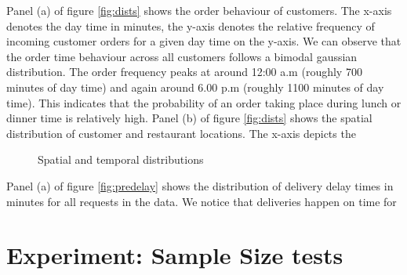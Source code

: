 Panel (a) of figure \ref{fig:dists} shows the order behaviour of customers. The x-axis denotes the day time in minutes, the y-axis denotes the relative frequency of incoming customer orders for a given day time on the y-axis. We can observe that the order time behaviour across all customers follows a bimodal gaussian distribution. The order frequency peaks at around 12:00 a.m (roughly 700 minutes of day time) and again around 6.00 p.m (roughly 1100 minutes of day time). This indicates that the probability of an order taking place during lunch or dinner time is relatively high.  
Panel (b) of figure \ref{fig:dists} shows the spatial distribution of customer and restaurant locations. The x-axis depicts the  

\begin{figure}[h]
	\centering
	\caption{Spatial and temporal distributions}
	\label{fig:prepdelay}
\end{figure}

Panel (a) of figure \ref{fig:predelay} shows the distribution of delivery delay times in minutes for all requests in the data. We notice that deliveries happen on time for 


\section{Experiment: Sample Size tests}\label{sec:samplesize}


